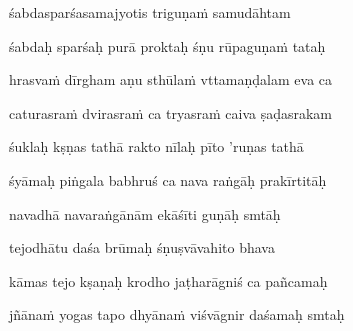śabdasparśasamajyotis triguṇa\.m samudāhtam \veg\dontdisplaylinenum

śabdaḥ sparśaḥ purā proktaḥ śṇu rūpaguṇa\.m tataḥ\thinspace{\dandab} \dontdisplaylinenum

hrasva\.m dīrgham aṇu sthūla\.m vttamaṇḍalam eva ca \veg\dontdisplaylinenum

caturasra\.m dvirasra\.m ca tryasra\.m caiva ṣaḍasrakam\thinspace{\dandab} \dontdisplaylinenum

śuklaḥ kṣṇas tathā rakto nīlaḥ pīto 'ruṇas tathā \veg\dontdisplaylinenum

śyāmaḥ piṅgala babhruś ca nava raṅgāḥ prakīrtitāḥ\thinspace{\dandab} \dontdisplaylinenum

navadhā navaraṅgānām ekāśīti guṇāḥ smtāḥ \veg\dontdisplaylinenum

tejodhātu daśa brūmaḥ śṇuṣvāvahito bhava\thinspace{\dandab} \dontdisplaylinenum

kāmas tejo kṣaṇaḥ krodho jaṭharāgniś ca pañcamaḥ \veg\dontdisplaylinenum

jñāna\.m yogas tapo dhyāna\.m viśvāgnir daśamaḥ smtaḥ\thinspace{\dandab} \dontdisplaylinenum

